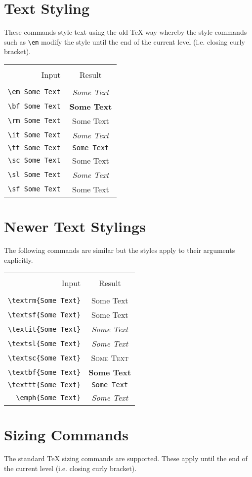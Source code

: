 \newenvironment{demotable}
{\begin{center}
 \begin{tabular}{|r|c|}
 \hline \\
 Input & Result \\
 \hline \\
}{\hline
 \end{tabular}
 \end{center}
}

\newcommand{\demo}[1]{\verb|#1| & #1 \\}

\section*{Text Styling}

These commands style text using the old TeX way whereby the
style commands such as \verb|\em| modify the style until the
end of the current level (i.e. closing curly bracket).

\newcommand{\styledemo}[1]{\demo{#1 Some Text}}
\begin{demotable}
\styledemo{\em}
\styledemo{\bf}
\styledemo{\rm}
\styledemo{\it}
\styledemo{\tt}
\styledemo{\sc}
\styledemo{\sl}
\styledemo{\sf}
\end{demotable}

\section*{Newer Text Stylings}

The following commands are similar but the styles apply to their
arguments explicitly.

\newcommand{\textstyledemo}[1]{\demo{#1{Some Text}}}

\begin{demotable}
\textstyledemo{\textrm}
\textstyledemo{\textsf}
\textstyledemo{\textit}
\textstyledemo{\textsl}
\textstyledemo{\textsc}
\textstyledemo{\textbf}
\textstyledemo{\texttt}
\textstyledemo{\emph}
\end{demotable}

\section*{Sizing Commands}

The standard TeX sizing commands are supported. These apply until the
end of the current level (i.e. closing curly bracket).

